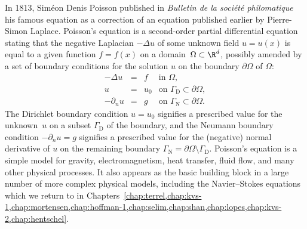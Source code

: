 In 1813, Sim\'eon Denis Poisson published in \emph{Bulletin de la
soci\'et\'e philomatique} his famous equation as a correction of an
equation published earlier by Pierre-Simon Laplace. Poisson's equation
is a second-order partial differential equation stating that the
negative Laplacian $-\Delta u$ of some unknown field $u = u(x)$ is
equal to a given function $f = f(x)$ on a
domain~$\Omega \subset \R^d$, possibly amended by a set of boundary
conditions for the solution $u$ on the boundary $\partial \Omega$ of
$\Omega$:
\begin{equation} \label{eq:poisson}
  \begin{array}{rcll}
    - \Delta u &=& f &\mbox{in } \Omega, \\
    u &=& u_0 &\mbox{on } \Gamma_{\mathrm{D}} \subset \partial \Omega, \\
    - \partial_n u &=& g &\mbox{on } \Gamma_{\mathrm{N}} \subset \partial \Omega.
  \end{array}
\end{equation}
%
The Dirichlet boundary condition $u = u_0$ signifies a prescribed
value for the unknown~$u$ on a subset $\Gamma_{\mathrm{D}}$ of the
boundary, and the Neumann boundary condition $-\partial_n u = g$
signifies a prescribed value for the (negative) normal derivative of
$u$ on the remaining boundary $\Gamma_{\mathrm{N}}
= \partial \Omega \setminus
\Gamma_{\mathrm{D}}$. Poisson's equation is a simple model for gravity,
electromagnetism, heat transfer, fluid flow, and many other physical
processes. It also appears as the basic building block in a large
number of more complex physical models, including the Navier--Stokes
equations which we return to in
Chapters~\ref{chap:terrel,chap:kvs-1,chap:mortensen,chap:hoffman-1,chap:selim,chap:shan,chap:lopes,chap:kvs-2,chap:hentschel}.

